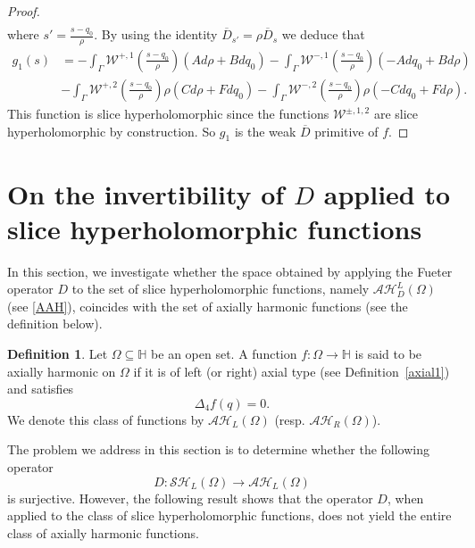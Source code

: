 \documentclass[reqno,11pt]{amsart}
\numberwithin{equation}{section}
\theoremstyle{definition}
\newtheorem{definition}[theorem]{Definition}
\begin{document}
\begin{proof}
\begin{align*}
	\end{align*}
	where $s'=\frac{s-q_0}{\rho}$. By using the identity $\overline D_{s'}=\rho \overline D_s$ we deduce that
	\begin{align*}
		g_1(s)& =-\int_{\Gamma} \mathcal W^{+,1} \left( \frac{s-q_0}{\rho} \right)  (Ad\rho +Bdq_0)-\int_{\Gamma}  \mathcal W^{-,1} \left( \frac{s-q_0}{\rho} \right)   (-Adq_0 +Bd\rho)\\
		&-\int_{\Gamma}  \mathcal W^{+,2} \left( \frac{s-q_0}{\rho} \right) \rho (Cd\rho +Fdq_0)-\int_{\Gamma}  \mathcal W^{-,2} \left( \frac{s-q_0}{\rho} \right) \rho (-Cdq_0 +Fd\rho).
	\end{align*}
This function is slice hyperholomorphic since the functions $\mathcal W^{\pm,1,2}$ are slice hyperholomorphic by construction. So $g_1$ is the weak $\overline{D}$ primitive of $f$.
\end{proof}








\section{On the invertibility of $D$ applied to slice hyperholomorphic functions}

In this section, we investigate whether the space obtained by applying the Fueter operator $D$ to the set of slice hyperholomorphic functions, namely $\mathcal{AH}_D^L(\Omega)$ (see \eqref{AAH}), coincides with the set of axially harmonic functions (see the definition below).

\begin{definition}
	Let $\Omega \subseteq \mathbb{H}$ be an open set. A function $f: \Omega \to \mathbb{H}$ is said to be axially harmonic on $\Omega$ if it is of left (or right) axial type (see Definition~\ref{axial1}) and satisfies
$$
	\Delta_4 f(q)=0.
$$
	We denote this class of functions by $\mathcal{AH}_L(\Omega)$ (resp. $\mathcal{AH}_R(\Omega)$).
\end{definition}

The problem we address in this section is to determine whether the following operator
\begin{equation}
	D: \mathcal{SH}_L(\Omega) \longrightarrow \mathcal{AH}_L(\Omega)
\end{equation}
is surjective. However, the following result shows that the operator $D$, when applied to the class of slice hyperholomorphic functions, does not yield the entire class of axially harmonic functions.
\end{document}
